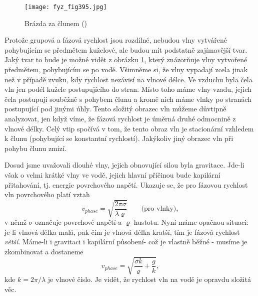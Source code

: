 {  \begin{figure}[ht!] %
    \centering
    \texttt{[image: fyz\_fig395.jpg]}
    \caption{Brázda za člunem
             (\cite[s.~696]{Feynman01})}
    \label{fyz:fig395}
  \end{figure}
  
  Protože grupová a fázová rychlost jsou rozdílné, nebudou vlny vytvářené pohybujícím se předmětem 
  kuželové, ale budou mít podstatně zajímavější tvar. Jaký tvar to bude je možné vidět z obrázku 
  \ref{fyz:fig395}, který znázorňuje vlny vytvořené předmětem, pohybujícím se po vodě. Všimněme si, 
  že vlny vypadají zcela jinak než v případě zvuku, kdy rychlost nezávisí na vlnové délce. Ve 
  vzduchu byla čela vln jen podél kužele postupujícího do stran. Místo toho máme vlny vzadu, jejich 
  čela postupují souběžně s pohybem člunu a kromě nich máme vlnky po stranách postupující pod 
  jinými úhly. Tento složitý obrazec vln můžeme důvtipně analyzovat, jen když víme, že fázová 
  rychlost je úměrná druhé odmocnině z vlnové délky. Celý vtip spočívá v tom, že tento obraz vln je 
  stacionární vzhledem k člunu (pohybující se konstantní rychlostí). Jakýkoliv jiný obrazec vln při 
  pohybu člunu zmizí.
  
  Dosud jsme uvažovali dlouhé vlny, jejich obnovující silou byla gravitace. Jde-li však o velmi 
  krátké vlny ve vodě, jejich hlavní příčinou bude kapilární přitahování, tj. energie povrchového 
  napětí. Ukazuje se, že pro fázovou rychlost vln povrchového platí vztah
  \begin{equation*}
    v_{phase} = \sqrt{\dfrac{2\pi\sigma}{\lambda\varrho}}\qquad\text{(pro vlnky)},
  \end{equation*}
  v němž \(\sigma\) označuje povrchové napětí a \(\varrho\) hustotu. Nyní máme opačnou situaci: 
  je-li vlnová délka malá, pak čím je vlnová délka kratší, tím je fázová rychlost \emph{větší}. 
  Máme-li i gravitaci i kapilární působení- což je vlastně běžné - musíme je zkombinovat a dostaneme
  \begin{equation*}
    v_{phase} = \sqrt{\dfrac{\sigma k}{\varrho} + \dfrac{g}{k}},
  \end{equation*}
  kde \(k = 2\pi/\lambda\) je vlnové číslo. Je vidět, že rychlost vln na vodě je opravdu složitá 
  věc.

}

